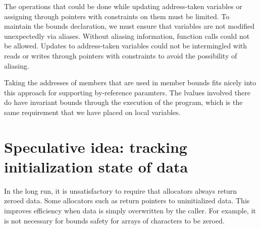 The operations that could be done while updating
address-taken variables or assigning through pointers with 
constraints on them must be limited.
To maintain the bounds declaration, we must ensure that
variables are not modified unexpectedly via aliases. 
Without aliasing information, function calls could not
be allowed.  Updates to address-taken variables could
not be intermingled with reads or writes through pointers
with constraints to avoid the possibility of aliasing.

Taking the addresses of members that are used in member
bounds fits nicely into this approach for supporting
by-reference paramters.  The lvalues involved there do have
invariant bounds through the execution of the program,
which is the same requirement that we have placed on
local variables.

\section{Speculative idea: tracking initialization state of data}
\label{section:allocation-of-uninitialized-data}

In the long run, it is unsatisfactory to require that allocators always
return zeroed data.  Some allocators such as  return pointers to
uninitialized data.  This improves efficiency when data is
simply overwritten by the caller.  For example, it is not necessary
for bounds safety for arrays of characters to be zeroed.

